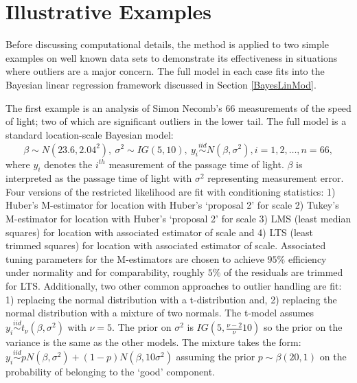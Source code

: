 \documentclass[ba]{imsart}
\newcommand{\iid}{\stackrel{iid}{\sim}}
\begin{document}
\section{Illustrative Examples}
\label{illustrations}
Before discussing computational details, the method is applied to two simple examples on well known data sets to demonstrate its effectiveness in situations where outliers are a major concern. The full model in each case fits into the Bayesian linear regression framework discussed in Section \ref{BayesLinMod}. %

The first example is an analysis of Simon Necomb's 66 measurements of the speed of light; two of which are significant outliers in the lower tail. The full model is a standard location-scale Bayesian model:
\begin{equation}
\beta\sim N(23.6, 2.04^{2}),\  \sigma^{2}\sim IG(5, 10), \ y_{i}\iid N (\beta, \sigma^{2}), i=1,2,\dots, n=66,
\end{equation}
where $y_{i}$ denotes the $i^{th}$ measurement of the passage time of light. $\beta$ is interpreted as the passage time of light with $\sigma^{2}$ representing measurement error.
Four versions of the restricted likelihood are fit with conditioning statistics: 1) Huber's M-estimator for location with Huber's `proposal 2'  for scale 2)  Tukey's M-estimator for location with Huber's `proposal 2'  for scale 3) LMS (least median squares) for location with associated estimator of scale and 4) LTS (least trimmed squares)  for location with associated estimator of scale. Associated tuning parameters for the M-estimators are chosen to achieve $95\%$ efficiency under normality \citep{huber2009} and for comparability, roughly $5\%$ of the residuals are trimmed for LTS.  Additionally, two other common approaches to outlier handling are fit: 1) replacing the normal distribution with a t-distribution and, 2) replacing the normal distribution with a mixture of two normals. The t-model assumes $y_{i}\iid t_{\nu} (\beta, \sigma^{2})$ with $\nu=5$. The prior on $\sigma^{2}$ is $IG(5, \frac{\nu-2}{\nu}10)$ so the prior on the variance is the same as the other models. The mixture takes the form: $y_{i}\iid pN (\beta, \sigma^{2}) + (1-p)N(\beta, 10\sigma^{2})$ assuming the prior $p \sim \beta(20,1)$ on the probability of belonging to the `good' component.  
\end{document}
